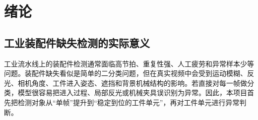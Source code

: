 \documentclass[12pt,hyperref,a4paper,UTF8,fontset=fandol]{ctexart}
\begin{document}

\newpage
\section{绪论}

\subsection{工业装配件缺失检测的实际意义}

工业流水线上的装配件检测通常面临高节拍、重复性强、人工疲劳和异常样本少等问题。装配件缺失看似是简单的二分类问题，但在真实视频中会受到运动模糊、反光、相机角度、工件进入姿态、遮挡和背景机械结构的影响。若直接对每一帧做分类，模型很容易把进入过程、局部反光或机械夹具误识别为异常。因此，本项目首先把检测对象从“单帧”提升到“稳定到位的工件单元”，再对工件单元进行异常判断。
\end{document}
